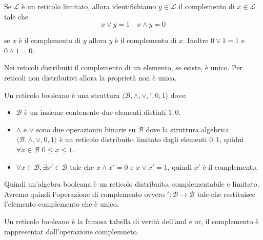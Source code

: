 \begin{definizione}
    Se $\mathcal{L}$ è un reticolo limitato, allora identifichiamo $y\in\mathcal{L}$
    il complemento di $x\in \mathcal{L}$ tale che 
    $$x\lor y = 1 \quad x\land y = 0$$
\end{definizione}
se $x$ è il complemento di $y$ allora $y$ è il complemento di $x$.
Inoltre $0\lor 1= 1$ e $0\land 1 = 0$.

Nei reticoli distribuiti il complemento di un elemento, se esiste, è unico. Per 
reticoli non distributivi allora la proprietà non è unica. 

\begin{definizione}
    Un reticolo booleano è una struttura $\langle \mathcal{B}, \land,\lor, ',0,1\rangle$ 
    dove:
    \begin{itemize}
        \item $\mathcal{B}$ è un insieme contenente due elementi distinti $1,0$.
        \item $\land$ e $\lor$ sono due operazionin binarie su $\mathcal{B}$ dove 
        la struttura algebrica $\langle \mathcal{B}, \land,\lor, 0,1\rangle$  è 
        un reticolo distribuito limitato dagli elementi $0,1$, quidni $\forall x\in \mathcal{B}$
        $0\le x\le 1$.
        \item $\forall x \in \mathcal{B}, \exists x'\in \mathcal{B}$ tale che 
        $x\land x' = 0$ e $x\lor x' = 1$, quindi $x'$ è il complemento.
    \end{itemize}
\end{definizione}

Quindi un'algebra booleana è un reticolo distribuito, complementabile e limitato.
Avremo quindi l'operazione di complemento ovvero $':\mathcal{B}\to \mathcal{B}$
 tale che restituisce l'elemento complemento che è unico.

\begin{esempio}
    Un reticolo booleano è la famosa tabella di verità dell'and e or, il complemento 
    è rappresentat dall'operazione complemneto.
\end{esempio}

